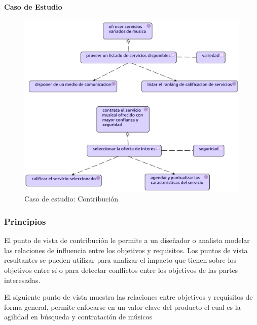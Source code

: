 \paragraph{Caso de Estudio}
\begin{figure}[h!]
	\centering
	\includegraphics[width=\linewidth]{Desarrollo/ArquitecturaEmpresarial/Motivacion/imgs/Contribucion.pdf}
	\caption{Caso de estudio: Contribución}
	\label{fig:comportamiento}
\end{figure}

\newpage


\subsubsection{Principios}
El punto de vista de contribución le permite a un diseñador o analista modelar las relaciones de influencia entre los objetivos y requisitos. Los puntos de vista resultantes se pueden utilizar para analizar el impacto que tienen sobre los objetivos entre sí o para detectar conflictos entre los objetivos de las partes interesadas.
  \vspace{\baselineskip}

El siguiente punto de vista muestra las relaciones entre objetivos y requisitos de forma general, permite enfocarse en un valor clave del producto el cual es la agilidad en búsqueda y contratación de músicos


